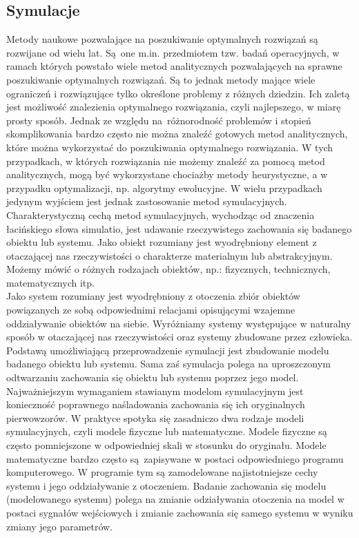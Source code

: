 \documentclass[10pt, a
4paper]{article}
\begin{document}
\subsection{Symulacje}
Metody naukowe pozwalające na poszukiwanie optymalnych rozwiązań są rozwijane od wielu lat. Są~one m.in. przedmiotem tzw. badań operacyjnych, w ramach których powstało wiele metod analitycznych pozwalających na sprawne poszukiwanie optymalnych rozwiązań. Są to jednak metody mające wiele ograniczeń i rozwiązujące tylko określone problemy z różnych dziedzin. Ich zaletą jest możliwość znalezienia optymalnego rozwiązania, czyli najlepszego, w miarę prosty sposób. Jednak ze względu na~różnorodność problemów i stopień skomplikowania bardzo często nie można znaleźć gotowych metod analitycznych, które można wykorzystać do poszukiwania optymalnego rozwiązania. W tych przypadkach, w których rozwiązania nie możemy znaleźć za pomocą metod analitycznych, mogą być wykorzystane chociażby metody heurystyczne, a w przypadku optymalizacji, np. algorytmy ewolucyjne. W wielu przypadkach jedynym wyjściem jest jednak zastosowanie metod symulacyjnych.\\
\indent Charakterystyczną cechą metod symulacyjnych, wychodząc od znaczenia łacińskiego słowa simulatio, jest udawanie rzeczywistego zachowania się badanego obiektu lub systemu. Jako obiekt rozumiany jest wyodrębniony element z otaczającej nas rzeczywistości o charakterze materialnym lub abstrakcyjnym. Możemy mówić o różnych rodzajach obiektów, np.: fizycznych, technicznych, matematycznych itp.\\
Jako system rozumiany jest wyodrębniony z otoczenia zbiór obiektów powiązanych ze sobą odpowiednimi relacjami opisującymi wzajemne oddziaływanie obiektów na siebie. Wyróżniamy systemy występujące w naturalny sposób w otaczającej nas rzeczywistości oraz systemy zbudowane przez człowieka. Podstawą umożliwiającą przeprowadzenie symulacji jest zbudowanie modelu badanego obiektu lub systemu. Sama zaś symulacja polega na uproszczonym odtwarzaniu zachowania się obiektu lub systemu poprzez jego model. Najważniejszym wymaganiem stawianym modelom symulacyjnym jest konieczność poprawnego naśladowania zachowania się ich oryginalnych pierwowzorów. W praktyce spotyka się zasadniczo dwa rodzaje modeli symulacyjnych, czyli modele fizyczne lub matematyczne. Modele fizyczne są często pomniejszone w odpowiedniej skali w stosunku do oryginału. Modele matematyczne bardzo często są~zapisywane w postaci odpowiedniego programu komputerowego. W programie tym są zamodelowane najistotniejsze cechy systemu i jego oddziaływanie z otoczeniem. Badanie zachowania się modelu (modelowanego systemu) polega na zmianie odziaływania otoczenia na model w postaci sygnałów wejściowych i zmianie zachowania się samego systemu w wyniku zmiany jego parametrów.
\end{document}
